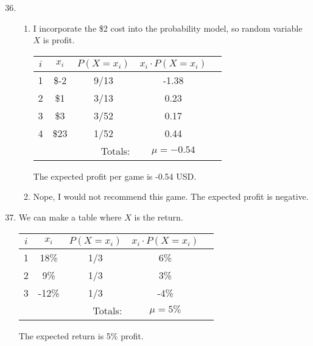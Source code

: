 \documentclass[12pt,letterpaper]{article}
\begin{document}
\newcommand{\AND}{\textsc{~and~}}
\newcommand{\OR}{\textsc{~or~}}
\newcommand{\GIVEN}{\textsc{~given~}}

\begin{enumerate}
\setcounter{enumi}{35}
\item \begin{enumerate}
\item I incorporate the \$2 cost into the probability model, so random variable $X$ is profit.
\begin{center}
\renewcommand{\arraystretch}{1.3}
\begin{tabular}{|c|c|c|c|c|} \hline
$i$ & $x_i$ & $P(X=x_i)$ & $x_i \cdot P(X=x_i)$ \\ \hline
1 & \$-2 & 9/13 & -1.38  \\
2 & \$1 & 3/13 & 0.23  \\
3 & \$3 & 3/52 & 0.17 \\
4 & \$23 & 1/52 & 0.44 \\ \hline
\multicolumn{3}{r|}{Totals:} & $\mu=-0.54$  \\\cline{4-4}
\end{tabular}
\end{center}
The expected profit per game is -0.54 USD.
\item Nope, I would not recommend this game. The expected profit is negative.
\end{enumerate}

\item We can make a table where $X$ is the return.
\begin{center}
\renewcommand{\arraystretch}{1.3}
\begin{tabular}{|c|c|c|c|c|} \hline
$i$ & $x_i$ & $P(X=x_i)$ & $x_i \cdot P(X=x_i)$ \\ \hline
1 & 18\% & 1/3 & 6\%  \\
2 & 9\% & 1/3 & 3\% \\
3 & -12\% & 1/3 & -4\% \\\hline
\multicolumn{3}{r|}{Totals:} & $\mu=5\%$  \\\cline{4-4}
\end{tabular}
\end{center}
The expected return is 5\% profit.


\end{enumerate}
\end{document}
